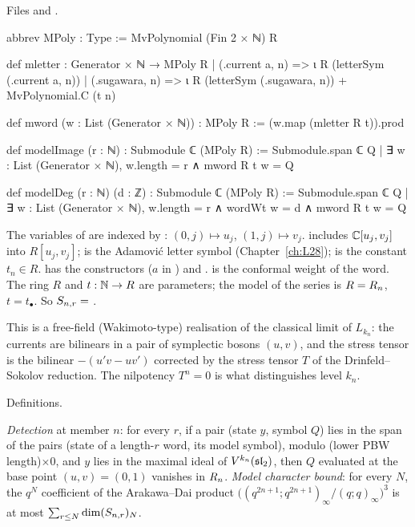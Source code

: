 \noindent Files  and
.
\begin{leancode}
abbrev MPoly : Type := MvPolynomial (Fin 2 × ℕ) R

def mletter : Generator × ℕ → MPoly R
  | (.current a, n) => ι R (letterSym (.current a, n))
  | (.sugawara, n) => ι R (letterSym (.sugawara, n)) + MvPolynomial.C (t n)

def mword (w : List (Generator × ℕ)) : MPoly R := (w.map (mletter R t)).prod

def modelImage (r : ℕ) : Submodule ℂ (MPoly R) :=
  Submodule.span ℂ {Q | ∃ w : List (Generator × ℕ), w.length = r ∧ mword R t w = Q}

def modelDeg (r : ℕ) (d : ℤ) : Submodule ℂ (MPoly R) :=
  Submodule.span ℂ
    {Q | ∃ w : List (Generator × ℕ), w.length = r ∧ wordWt w = d ∧ mword R t w = Q}
\end{leancode}

\begin{dictionary}
The variables of  are indexed by : $(0,j)\mapsto u_j$, $(1,j)\mapsto v_j$. 
includes ${\mathbb{C}}[u_j,v_j]$ into $R[u_j,v_j]$;  is the Adamovi\'c letter symbol (Chapter~\ref{ch:L28});
 is the constant $t_n\in R$.  has the constructors 
($a$ in ) and .  is the conformal weight of the word. The ring $R$ and
$t:{\mathbb{N}}\to R$ are parameters; the model of the series is $R=R_n$, $t=t_\bullet$. So
$S_{n,r}=$ .
\end{dictionary}

\begin{physics}
This is a free-field (Wakimoto-type) realisation of the classical limit of $L_{k_n}$: the currents are bilinears in a
pair of symplectic bosons $(u,v)$, and the stress tensor is the bilinear $-(u'v-uv')$ corrected by the stress tensor
$T$ of the Drinfeld--Sokolov reduction. The nilpotency $T^n=0$ is what distinguishes level $k_n$.
\end{physics}

\begin{status}
Definitions.
\end{status}

\begin{definition}\label{l29:def:detect}
\emph{Detection} at member $n$: for every $r$, if a pair (state $y$, symbol $Q$) lies in the span of the pairs
(state of a length-$r$ word, its model symbol), modulo (lower PBW length)$\times0$, and $y$ lies in the maximal ideal of
$V^{k_n}(\mathfrak{sl}_2)$, then $Q$ evaluated at the base point $(u,v)=(0,1)$ vanishes in $R_n$.
\emph{Model character bound}: for every $N$, the $q^N$ coefficient of the Arakawa--Dai product
$\bigl((q^{2n+1};q^{2n+1})_\infty/(q;q)_\infty\bigr)^3$ is at most $\sum_{r\le N}\dim(S_{n,r})_N$.
\end{definition}

